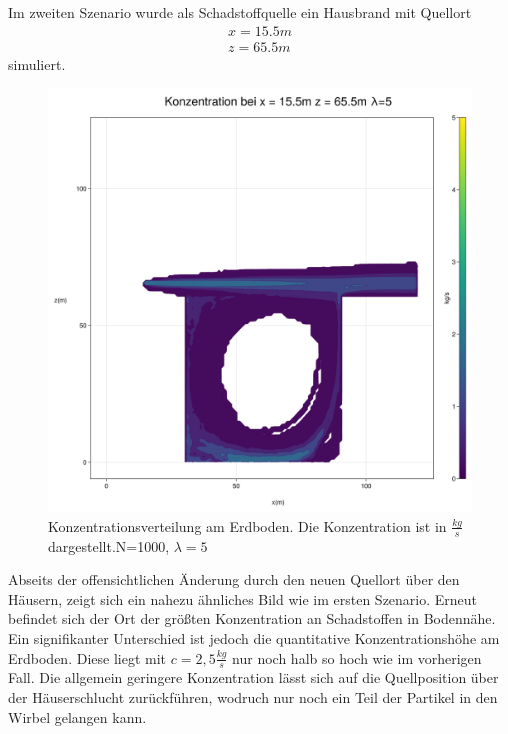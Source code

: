 \documentclass[ngerman]{scrartcl}
\begin{document}
Im zweiten Szenario wurde als  Schadstoffquelle ein Hausbrand mit Quellort
\begin{align}
	x=15.5 \si{m} \\
	z= 65.5 \si{m} 
\end{align}
simuliert.
\begin{figure}[H]
	\centering
	\includegraphics[scale=0.3]{Bilder/3_single_x = 15.5.png}
	\caption{Konzentrationsverteilung am Erdboden. Die Konzentration ist in $\frac{\si{kg}}{\si{s}}$ dargestellt.N=1000, $\lambda =5$}
	\label{fig:my_label}
\end{figure}
Abseits der offensichtlichen Änderung durch den neuen Quellort über den Häusern, zeigt sich ein nahezu ähnliches Bild wie im ersten Szenario. Erneut befindet sich der Ort der größten Konzentration an Schadstoffen in Bodennähe. Ein signifikanter Unterschied ist jedoch die quantitative  Konzentrationshöhe am Erdboden. Diese liegt mit $c= 2,5 \frac{\si{kg}}{\si{s}}$ nur noch halb so hoch wie im vorherigen Fall. Die allgemein geringere Konzentration lässt sich auf die Quellposition über der Häuserschlucht zurückführen, wodruch nur noch ein Teil der Partikel in den Wirbel gelangen kann.
\end{document}
